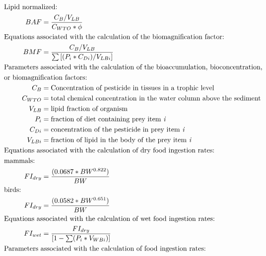 \documentclass[10pt]{article}
\begin{document}
\begin{align*}
&    \hspace{-0.75in} \text{Lipid normalized:}\nonumber \\
BAF & = \frac{C_{B}/{V_{LB}}}{C_{WTO}*\phi}\nonumber \\
&    \hspace{-.75in}  \text{Equations associated with the calculation of the biomagnification factor:}\nonumber \\
BMF & = \frac{C_{B}/V_{LB}}{\sum\left[(P_{i}*C_{Di})/V_{LBi}\right]}\nonumber \\
&    \hspace{-.75in}  \text{Parameters associated with the calculation of the bioaccumulation, bioconcentration,} \nonumber\\ &\hspace{-0.75in} \text{or biomagnification factors:}\nonumber \\
C_{B} & = \text{Concentration of pesticide in tissues in a trophic level}\nonumber \\
C_{WTO} & = \text{total chemical concentration in the water column above the sediment}\nonumber \\
V_{LB} & = \text{lipid fraction of organism} \nonumber\\
P_{i} & = \text{fraction of diet containing prey item \it{i}}\\
C_{Di} & = \text{concentration of the pesticide in prey item \it{i}}\\
V_{LBi} & = \text{fraction of lipid in the body of the prey item \it{i}}\\
&    \hspace{-.75in}  \text{Equations associated with the calculation of dry food ingestion rates:}\nonumber \\
&    \hspace{-0.75in} \text{mammals:}\nonumber \\
FI_{dry} & = \frac{(0.0687*BW^{0.822})}{BW}\\
&    \hspace{-0.75in} \text{birds:}\nonumber \\
FI_{dry} & = \frac{(0.0582*BW^{0.651})}{BW}\\
&    \hspace{-.75in}  \text{Equations associated with the calculation of wet food ingestion rates:}\nonumber \\
FI_{wet} & = \frac{FI_{dry}}{[1-\sum(P_{i}*V_{WBi})]}\\
&    \hspace{-.75in}  \text{Parameters associated with the calculation of food ingestion rates:}\nonumber \\

\end{align*}
\end{document}
